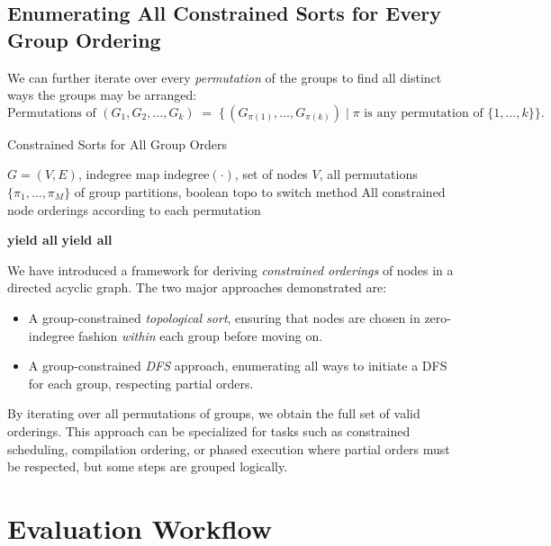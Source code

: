 \subsection{Enumerating All Constrained Sorts for Every Group Ordering}
We can further iterate over every \emph{permutation} of the groups to find all distinct ways the groups may be arranged:
\[
  \text{Permutations of } (G_1, G_2, \dots, G_k) \;=\; \{\,(G_{\pi(1)}, \dots, G_{\pi(k)}) \;|\; \pi \text{ is any permutation of } \{1,\dots,k\}\}.
\]
\begin{algorithm}[H]
\caption{Constrained Sorts for All Group Orders}
\label{alg:constrained-sorts-all-group-orders}
\begin{algorithmic}[1]

\Require \(G = (V,E)\), \(\text{indegree}\) map \(\text{indegree}(\cdot)\), set of nodes \(V\),
        all permutations \(\{\pi_1,\dots,\pi_M\}\) of group partitions,
        boolean \(\text{topo}\) to switch method
\Ensure All constrained node orderings according to each permutation

        \State \textbf{yield all} 
    \Else
        \State \textbf{yield all} 
    \EndIf
\EndFor

\end{algorithmic}
\end{algorithm}

We have introduced a framework for deriving \emph{constrained orderings} of nodes in a directed acyclic graph. The two major approaches demonstrated are:
\begin{itemize}
    \item A group-constrained \emph{topological sort}, ensuring that nodes are chosen in zero-indegree fashion \emph{within} each group before moving on.
    \item A group-constrained \emph{DFS} approach, enumerating all ways to initiate a DFS for each group, respecting partial orders.
\end{itemize}
By iterating over all permutations of groups, we obtain the full set of valid orderings. This approach can be specialized for tasks such as constrained scheduling, compilation ordering, or phased execution where partial orders must be respected, but some steps are grouped logically.

\section{Evaluation Workflow}

